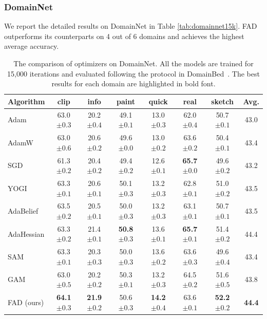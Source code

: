 \subsubsection{DomainNet}
We report the detailed results on DomainNet in Table \ref{tab:domainnet15k}. FAD outperforms its counterparts on 4 out of 6 domains and achieves the highest average accuracy.
\begin{table}[th]
\centering
\caption{The comparison of optimizers on DomainNet. All the models are trained for 15,000 iterations and evaluated following the protocol in DomainBed~\cite{gulrajani2020search}. The best results for each domain are highlighted in bold font.}
\begin{tabular}{lcccccc|c}
\toprule
\textbf{Algorithm} & clip & info & paint & quick  & real & sketch&  \textbf{Avg.} \\
\midrule

Adam  & 63.0 \footnotesize{$\pm 0.3$} &  20.2 \footnotesize{$\pm 0.4$} & 49.1 \footnotesize{$\pm 0.1$} & 13.0 \footnotesize{$\pm 0.3$} & 62.0 \footnotesize{$\pm 0.4$} & 50.7 \footnotesize{$\pm 0.1$} & 43.0 \\
AdamW  & 63.0 \footnotesize{$\pm 0.6$} &  20.6 \footnotesize{$\pm 0.2$} & 49.6 \footnotesize{$\pm 0.0$} & 13.0 \footnotesize{$\pm 0.2$} & 63.6 \footnotesize{$\pm 0.2$} & 50.4 \footnotesize{$\pm 0.1$} & 43.4  \\
SGD  & 61.3 \footnotesize{$\pm 0.2$} &  20.4 \footnotesize{$\pm 0.2$} & 49.4 \footnotesize{$\pm 0.2$} & 12.6 \footnotesize{$\pm 0.1$} & \textbf{65.7} \footnotesize{$\pm 0.0$} & 49.6 \footnotesize{$\pm 0.2$} & 43.2 \\
YOGI  & 63.3 \footnotesize{$\pm 0.1$} &  20.6 \footnotesize{$\pm 0.1$} & 50.1 \footnotesize{$\pm 0.3$} & 13.2 \footnotesize{$\pm 0.3$} & 62.8 \footnotesize{$\pm 0.1$} & 51.0 \footnotesize{$\pm 0.2$} & 43.5 \\
AdaBelief  & 63.5 \footnotesize{$\pm 0.2$} &  20.5 \footnotesize{$\pm 0.1$} & 50.0 \footnotesize{$\pm 0.3$} & 13.2 \footnotesize{$\pm 0.3$} & 63.1 \footnotesize{$\pm 0.1$} & 50.7 \footnotesize{$\pm 0.1$} & 43.5 \\
AdaHessian  & 63.3 \footnotesize{$\pm 0.2$} &  21.4 \footnotesize{$\pm 0.1$} & \textbf{50.8} \footnotesize{$\pm 0.3$} & 13.6 \footnotesize{$\pm 0.1$} & \textbf{65.7} \footnotesize{$\pm 0.1$} & 51.4 \footnotesize{$\pm 0.2$} & 44.4 \\
SAM  & 63.3 \footnotesize{$\pm 0.1$} & 20.3 \footnotesize{$\pm 0.3$} & 50.0 \footnotesize{$\pm 0.3$} & 13.6 \footnotesize{$\pm 0.2$} & 63.6 \footnotesize{$\pm 0.3$} & 49.6 \footnotesize{$\pm 0.4$} & 43.4 \\
GAM  & 63.0 \footnotesize{$\pm 0.5$} & 20.2 \footnotesize{$\pm 0.2$} & 50.3 \footnotesize{$\pm 0.1$} & 13.2 \footnotesize{$\pm 0.3$} & 64.5 \footnotesize{$\pm 0.2$} & 51.6 \footnotesize{$\pm 0.5$} & 43.8 \\
\midrule
FAD (ours) & \textbf{64.1} \footnotesize{$\pm 0.3$} & \textbf{21.9} \footnotesize{$\pm 0.2$} & 50.6 \footnotesize{$\pm 0.3$} & \textbf{14.2} \footnotesize{$\pm 0.4$} & 63.6 \footnotesize{$\pm 0.1$} & \textbf{52.2} \footnotesize{$\pm 0.2$} & \textbf{44.4} \\


\end{tabular}
\end{table}
